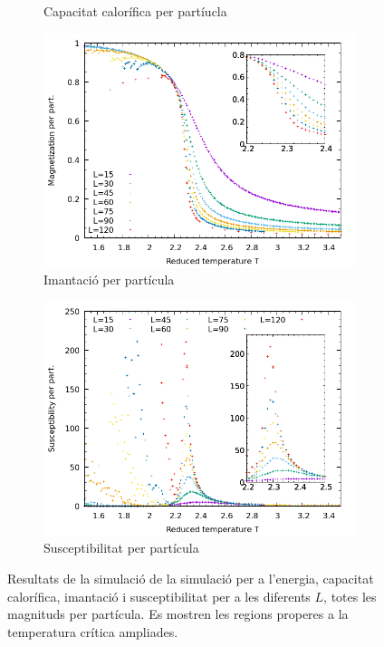 \documentclass[a4paper]{article}
\begin{document}
\begin{figure}[H]
\begin{subfigure}{.45\textwidth}
        \caption{Capacitat calorífica per partíucla}
        \label{fig:plot-cv}
    \end{subfigure}
        \begin{subfigure}{.45\textwidth}
        \centering
        \includegraphics[width=\textwidth]{plot-m.png}
        \caption{Imantació per partícula}
        \label{fig:plot-m}
    \end{subfigure}
    \begin{subfigure}{.45\textwidth}
        \centering
        \includegraphics[width=\textwidth]{plot-x.png}
        \caption{Susceptibilitat per partícula}
        \label{fig:plot-x}
    \end{subfigure}
    \caption{Resultats de la simulació de la simulació per a l'energia, capacitat calorífica, imantació i susceptibilitat per a les diferents $L$, totes les magnituds per partícula. Es mostren les regions properes a la temperatura crítica ampliades.}
\label{fig:plot}
\end{figure}
\end{document}
